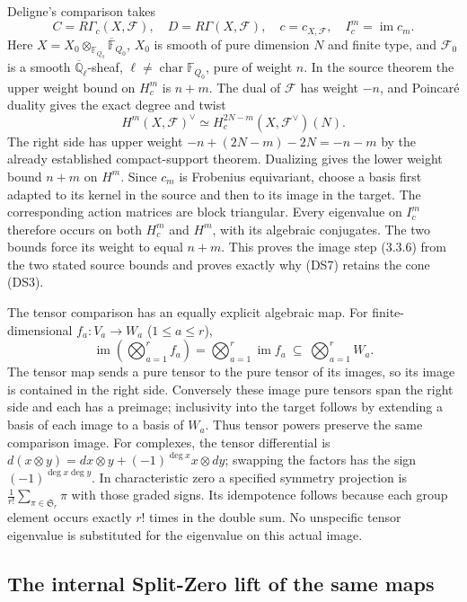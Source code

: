 Deligne's comparison takes
\[
 C=R\Gamma_c(X,\mathcal F),\quad D=R\Gamma(X,\mathcal F),\quad
 c=c_{X,\mathcal F},\quad I_c^m=\operatorname{im}c_m.
 \tag{DS7}
\]
Here $X=X_0\otimes_{\mathbb F_{Q_0}}\overline{\mathbb F}_{Q_0}$,
$X_0$ is smooth of pure dimension $N$ and finite type, and
$\mathcal F_0$ is a smooth $\overline{\mathbb Q}_\ell$-sheaf,
$\ell\ne\operatorname{char}\mathbb F_{Q_0}$, pure of weight $n$.
In the source theorem the upper weight bound on $H_c^m$ is $n+m$.
The dual of $\mathcal F$ has weight $-n$, and Poincar\'e duality gives
the exact degree and twist
\[
 H^m(X,\mathcal F)^\vee
 \simeq H_c^{2N-m}(X,\mathcal F^\vee)(N).
 \tag{DS8}
\]
The right side has upper weight
$-n+(2N-m)-2N=-n-m$ by the already established compact-support
theorem.  Dualizing gives the lower weight bound $n+m$ on $H^m$.
Since $c_m$ is Frobenius equivariant, choose a basis first adapted to
its kernel in the source and then to its image in the target.
The corresponding action matrices are block triangular.  Every
eigenvalue on $I_c^m$ therefore occurs on both $H_c^m$ and $H^m$,
with its algebraic conjugates.  The two bounds force its weight to
equal $n+m$.  This proves the image step (3.3.6) from the two stated
source bounds and proves exactly why (DS7) retains the cone (DS3).

The tensor comparison has an equally explicit algebraic map.  For
finite-dimensional $f_a:V_a\to W_a$ ($1\leq a\leq r$),
\[
 \operatorname{im}\left(\bigotimes_{a=1}^r f_a\right)
 =\bigotimes_{a=1}^r\operatorname{im}f_a
 \ \subseteq\ \bigotimes_{a=1}^r W_a.
 \tag{DS9}
\]
The tensor map sends a pure tensor to the pure tensor of its images,
so its image is contained in the right side.  Conversely these image
pure tensors span the right side and each has a preimage; inclusivity
into the target follows by extending a basis of each image to a basis
of $W_a$.  Thus tensor powers preserve the same comparison image.
For complexes, the tensor differential is
$d(x\otimes y)=dx\otimes y+(-1)^{\deg x}x\otimes dy$; swapping
the factors has the sign $(-1)^{\deg x\deg y}$.  In characteristic
zero a specified symmetry projection is
$\frac1{r!}\sum_{\pi\in\mathfrak S_r}\pi$ with those graded signs.
Its idempotence follows because each group element occurs exactly
$r!$ times in the double sum.  No unspecific tensor eigenvalue is
substituted for the eigenvalue on this actual image.

\subsection{The internal Split-Zero lift of the same maps}

